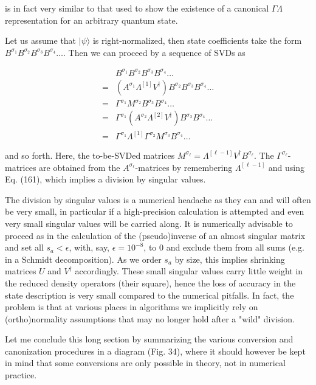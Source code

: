 \documentclass[12pt]{article}
\begin{document}
is in fact very similar to that used to show the existence of a canonical $\Gamma \Lambda$ representation for an arbitrary quantum state.

Let us assume that $|\psi\rangle$ is right-normalized, then state coefficients take the form $B^{\sigma_{1}} B^{\sigma_{2}} B^{\sigma_{3}} B^{\sigma_{4}} \ldots$. Then we can proceed by a sequence of SVDs as

$$
\begin{aligned}
& B^{\sigma_{1}} B^{\sigma_{2}} B^{\sigma_{3}} B^{\sigma_{4}} \ldots \\
= & \left(A^{\sigma_{1}} \Lambda^{[1]} V^{\dagger}\right) B^{\sigma_{2}} B^{\sigma_{3}} B^{\sigma_{4}} \ldots \\
= & \Gamma^{\sigma_{1}} M^{\sigma_{2}} B^{\sigma_{3}} B^{\sigma_{4}} \ldots \\
= & \Gamma^{\sigma_{1}}\left(A^{\sigma_{2}} \Lambda^{[2]} V^{\dagger}\right) B^{\sigma_{3}} B^{\sigma_{4}} \ldots \\
= & \Gamma^{\sigma_{1}} \Lambda^{[1]} \Gamma^{\sigma_{2}} M^{\sigma_{3}} B^{\sigma_{4}} \ldots
\end{aligned}
$$

and so forth. Here, the to-be-SVDed matrices $M^{\sigma_{\ell}}=\Lambda^{[\ell-1]} V^{\dagger} B^{\sigma_{\ell}}$. The $\Gamma^{\sigma_{\ell}}$-matrices are obtained from the $A^{\sigma_{\ell}}$-matrices by remembering $\Lambda^{[\ell-1]}$ and using Eq. (161), which implies a division by singular values.

The division by singular values is a numerical headache as they can and will often be very small, in particular if a high-precision calculation is attempted and even very small singular values will be carried along. It is numerically advisable to proceed as in the calculation of the (pseudo)inverse of an almost singular matrix and set all $s_{a}<\epsilon$, with, say, $\epsilon=10^{-8}$, to 0 and exclude them from all sums (e.g. in a Schmidt decomposition). As we order $s_{a}$ by size, this implies shrinking matrices $U$ and $V^{\dagger}$ accordingly. These small singular values carry little weight in the reduced density operators (their square), hence the loss of accuracy in the state description is very small compared to the numerical pitfalls. In fact, the problem is that at various places in algorithms we implicitly rely on (ortho)normality assumptions that may no longer hold after a "wild" division.

Let me conclude this long section by summarizing the various conversion and canonization procedures in a diagram (Fig. 34), where it should however be kept in mind that some conversions are only possible in theory, not in numerical practice.
\end{document}
